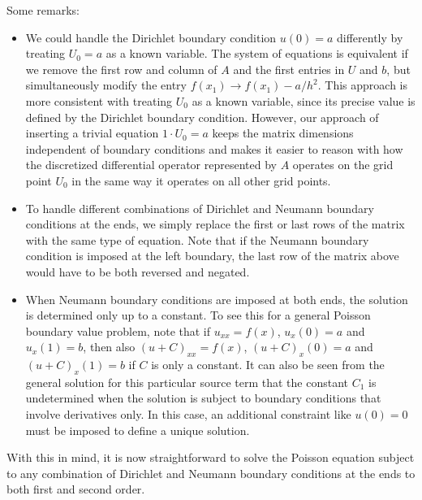 Some remarks:
\begin{itemize}
\item We could handle the Dirichlet boundary condition $u(0) = a$ differently by treating $U_0 = a$ as a known variable.
The system of equations is equivalent if we remove the first row and column of $A$ and the first entries in $U$ and $b$, but simultaneously modify the entry $f(x_1) \rightarrow f(x_1) - a/h^2$.
This approach is more consistent with treating $U_0$ as a known variable, since its precise value is defined by the Dirichlet boundary condition.
However, our approach of inserting a trivial equation $1 \cdot U_0 = a$ keeps the matrix dimensions independent of boundary conditions and makes it easier to reason with how the discretized differential operator represented by $A$ operates on the grid point $U_0$ in the same way it operates on all other grid points.
\item To handle different combinations of Dirichlet and Neumann boundary conditions at the ends, we simply replace the first or last rows of the matrix with the same type of equation.
Note that if the Neumann boundary condition is imposed at the left boundary, the last row of the matrix above would have to be both reversed and negated.
\item When Neumann boundary conditions are imposed at both ends, the solution is determined only up to a constant.
To see this for a general Poisson boundary value problem, note that if $u_{xx} = f(x)$, $u_x(0) = a$ and $u_x(1) = b$, then also $(u+C)_{xx} = f(x)$, $(u+C)_x(0) = a$ and $(u+C)_x(1) = b$ if $C$ is only a constant.
It can also be seen from the general solution for this particular source term that the constant $C_1$ is undetermined when the solution is subject to boundary conditions that involve derivatives only.
In this case, an additional constraint like $u(0) = 0$ must be imposed to define a unique solution.
\end{itemize}
With this in mind, it is now straightforward to solve the Poisson equation subject to any combination of Dirichlet and Neumann boundary conditions at the ends to both first and second order.

